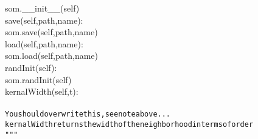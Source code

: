{{\begin{tabbing}
\hspace{48pt}som.\_\_init\_\_(self)\\
\hspace{6pt}save(self,path,name):\\
\hspace{48pt}som.save(self,path,name)\\
\hspace{6pt}load(self,path,name):\\
\hspace{48pt}som.load(self,path,name)\\
\hspace{6pt}randInit(self):\\
\hspace{48pt}som.randInit(self)\\
\hspace{6pt}kernalWidth(self,t):\\
\\
{\texttt{\hspace{48pt}You\hspace{6pt}should\hspace{6pt}overwrite\hspace{6pt}this,\hspace{6pt}see\hspace{6pt}note\hspace{6pt}above...}}\\
{\texttt{\hspace{48pt}kernalWidth\hspace{6pt}returns\hspace{6pt}the\hspace{6pt}width\hspace{6pt}of\hspace{6pt}the\hspace{6pt}neighborhood\hspace{6pt}in\hspace{6pt}terms\hspace{6pt}of\hspace{6pt}order}}\\
{\texttt{\hspace{48pt}\string"}}{\texttt{\string"\string"}}\\

\end{tabbing}}}
